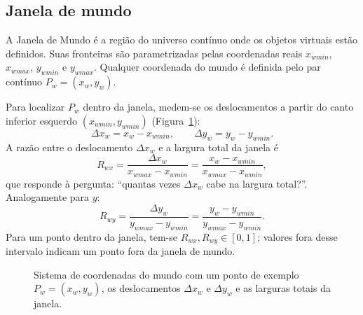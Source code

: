 \subsection{Janela de mundo}
A Janela de Mundo é a região do universo contínuo onde os objetos virtuais estão definidos. Suas fronteiras são parametrizadas pelas coordenadas reais $x_{wmin}$, $x_{wmax}$, $y_{wmin}$ e $y_{wmax}$. Qualquer coordenada do mundo é definida pelo par contínuo $P_w = (x_w, y_w)$.

Para localizar $P_w$ dentro da janela, medem-se os deslocamentos a partir do canto inferior esquerdo $(x_{wmin}, y_{wmin})$ (Figura~\ref{fig:mundo}):
\begin{equation}
    \Delta x_w = x_w - x_{wmin}, \qquad \Delta y_w = y_w - y_{wmin}.
\end{equation}
A razão entre o deslocamento $\Delta x_w$ e a largura total da janela é
\begin{equation}
    R_{wx} = \frac{\Delta x_w}{x_{wmax} - x_{wmin}} = \frac{x_w - x_{wmin}}{x_{wmax} - x_{wmin}},
    \label{eq:razao-mundo-x}
\end{equation}
que responde à pergunta: ``quantas vezes $\Delta x_w$ cabe na largura total?''. Analogamente para $y$:
\begin{equation}
    R_{wy} = \frac{\Delta y_w}{y_{wmax} - y_{wmin}} = \frac{y_w - y_{wmin}}{y_{wmax} - y_{wmin}}.
    \label{eq:razao-mundo-y}
\end{equation}
Para um ponto dentro da janela, tem-se $R_{wx}, R_{wy} \in [0,1]$; valores fora desse intervalo indicam um ponto fora da janela de mundo.

\begin{figure}[H]
    \centering
    \caption{Sistema de coordenadas do mundo com um ponto de exemplo $P_w = (x_w, y_w)$, os deslocamentos $\Delta x_w$ e $\Delta y_w$ e as larguras totais da janela.}
    \label{fig:mundo}
\end{figure}

